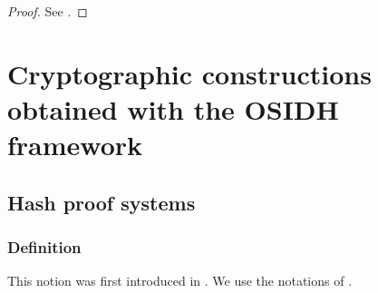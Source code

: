 \documentclass[a4paper,10pt]{report}
\theoremstyle{definition}
\theoremstyle{plain}
\theoremstyle{definition}
\renewcommand{\(}{\left(}
\renewcommand{\)}{\right)}
\begin{document}
\begin{proof}
See \cite[Theorem 7.1]{Kuperberg}.
\end{proof}

\chapter{Cryptographic constructions obtained with the OSIDH framework}\label{appendix C}

\section{Hash proof systems}

\subsection{Definition}

This notion was first introduced in \cite{Cramer_Shoup}. We use the notations of \cite{DeFeo1}.
\end{document}
